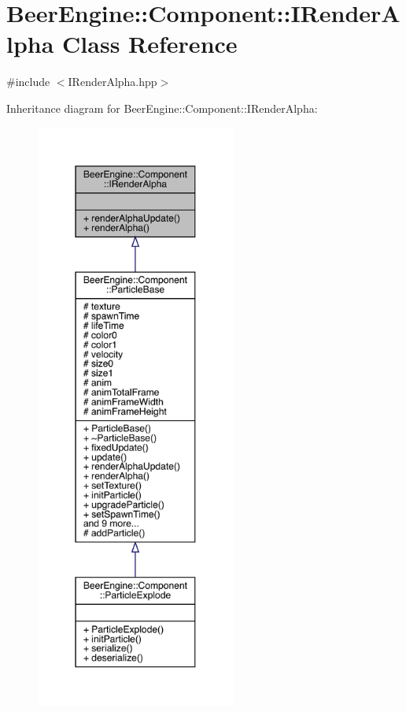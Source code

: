 \hypertarget{class_beer_engine_1_1_component_1_1_i_render_alpha}{}\section{Beer\+Engine\+:\+:Component\+:\+:I\+Render\+Alpha Class Reference}
\label{class_beer_engine_1_1_component_1_1_i_render_alpha}


{\ttfamily \#include $<$I\+Render\+Alpha.\+hpp$>$}



Inheritance diagram for Beer\+Engine\+:\+:Component\+:\+:I\+Render\+Alpha\+:\nopagebreak
\begin{figure}[H]
\begin{center}
\leavevmode
\includegraphics[height=550pt]{class_beer_engine_1_1_component_1_1_i_render_alpha__inherit__graph}
\end{center}
\end{figure}


